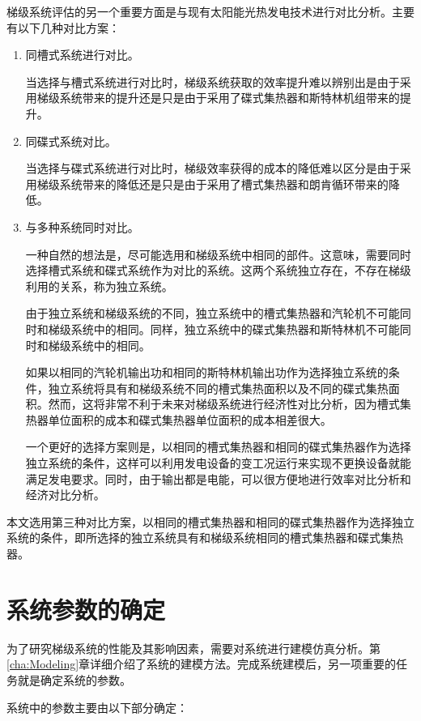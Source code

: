 梯级系统评估的另一个重要方面是与现有太阳能光热发电技术进行对比分析。主要有以下几种对比方案：

\begin{enumerate}[label=(\arabic*)]
	\item 同槽式系统进行对比。 

	当选择与槽式系统进行对比时，梯级系统获取的效率提升难以辨别出是由于采用梯级系统带来的提升还是只是由于采用了碟式集热器和斯特林机组带来的提升。
	\item 同碟式系统对比。
	
	当选择与碟式系统进行对比时，梯级效率获得的成本的降低难以区分是由于采用梯级系统带来的降低还是只是由于采用了槽式集热器和朗肯循环带来的降低。
	\item 与多种系统同时对比。
	
	一种自然的想法是，尽可能选用和梯级系统中相同的部件。这意味，需要同时选择槽式系统和碟式系统作为对比的系统。这两个系统独立存在，不存在梯级利用的关系，称为独立系统。
	
	由于独立系统和梯级系统的不同，独立系统中的槽式集热器和汽轮机不可能同时和梯级系统中的相同。同样，独立系统中的碟式集热器和斯特林机不可能同时和梯级系统中的相同。
	
	如果以相同的汽轮机输出功和相同的斯特林机输出功作为选择独立系统的条件，独立系统将具有和梯级系统不同的槽式集热面积以及不同的碟式集热面积。然而，这将非常不利于未来对梯级系统进行经济性对比分析，因为槽式集热器单位面积的成本和碟式集热器单位面积的成本相差很大。
	
	一个更好的选择方案则是，以相同的槽式集热器和相同的碟式集热器作为选择独立系统的条件，这样可以利用发电设备的变工况运行来实现不更换设备就能满足发电要求。同时，由于输出都是电能，可以很方便地进行效率对比分析和经济对比分析。
	
\end{enumerate}

本文选用第三种对比方案，以相同的槽式集热器和相同的碟式集热器作为选择独立系统的条件，即所选择的独立系统具有和梯级系统相同的槽式集热器和碟式集热器。

\section{系统参数的确定}

为了研究梯级系统的性能及其影响因素，需要对系统进行建模仿真分析。第\ref{cha:Modeling}章详细介绍了系统的建模方法。完成系统建模后，另一项重要的任务就是确定系统的参数。

系统中的参数主要由以下部分确定：


